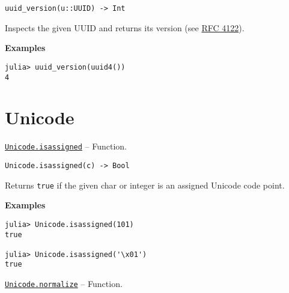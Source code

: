 \begin{adjustwidth}{2em}{0pt}


\begin{verbatim}
uuid_version(u::UUID) -> Int
\end{verbatim}

Inspects the given UUID and returns its version (see \href{https://www.ietf.org/rfc/rfc4122}{RFC 4122}).

\textbf{Examples}


\begin{verbatim}
julia> uuid_version(uuid4())
4
\end{verbatim}



\end{adjustwidth}

\hypertarget{1111253146082274876}{}


\chapter{Unicode}


\hypertarget{3408928680045716107}{}
\hyperlink{3408928680045716107}{\texttt{Unicode.isassigned}}  -- {Function.}

\begin{adjustwidth}{2em}{0pt}


\begin{verbatim}
Unicode.isassigned(c) -> Bool
\end{verbatim}

Returns \texttt{true} if the given char or integer is an assigned Unicode code point.

\textbf{Examples}


\begin{verbatim}
julia> Unicode.isassigned(101)
true

julia> Unicode.isassigned('\x01')
true
\end{verbatim}



\end{adjustwidth}
\hypertarget{6168731775693095830}{}
\hyperlink{6168731775693095830}{\texttt{Unicode.normalize}}  -- {Function.}

